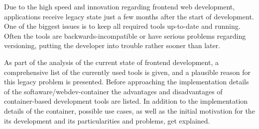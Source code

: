 Due to the high speed and innovation regarding frontend web development, applications receive legacy state just a few months after the start of development.
One of the biggest issues is to keep all required tools up-to-date and running.
Often the tools are backwards-incompatible or have serious problems regarding versioning, putting the developer into trouble rather sooner than later.

As part of the analysis of the current state of frontend development, a comprehensive list of the currently used tools is given, and a plausible reason for this legacy problem is presented.
Before approaching the implementation details of the softaware/webdev-container the advantages and disadvantages of container-based development tools are listed.
In addition to the implementation details of the container, possible use cases, as well as the initial motivation for the its development and its particularities and problems, get explained.
